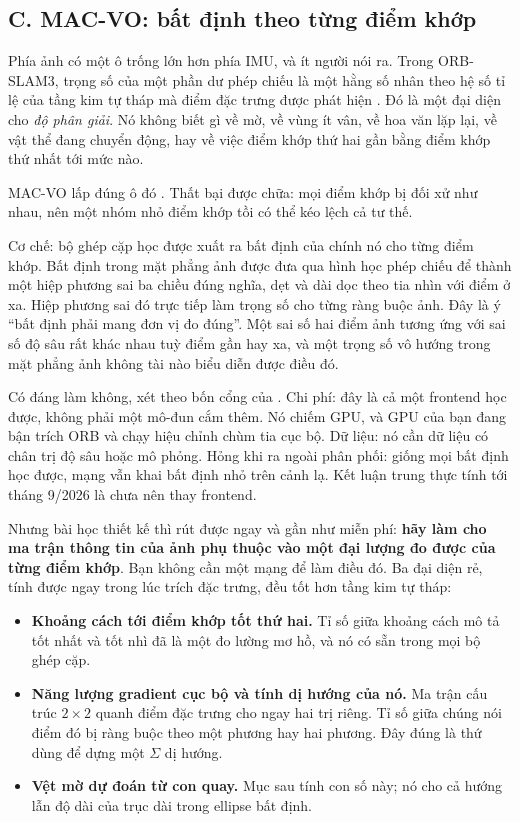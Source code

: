 \documentclass[../../deep_learning.tex]{subfiles}
\begin{document}
\subsection{C. MAC-VO: bất định theo từng điểm khớp}

Phía ảnh có một ô trống lớn hơn phía IMU, và ít người nói ra. Trong ORB-SLAM3, trọng số của một phần dư phép chiếu là một hằng số nhân theo hệ số tỉ lệ của tầng kim tự tháp mà điểm đặc trưng được phát hiện \cite{campos2021orbslam3}. Đó là một đại diện cho \emph{độ phân giải}. Nó không biết gì về mờ, về vùng ít vân, về hoa văn lặp lại, về vật thể đang chuyển động, hay về việc điểm khớp thứ hai gần bằng điểm khớp thứ nhất tới mức nào.

MAC-VO lấp đúng ô đó \cite{qiu2025macvo}. Thất bại được chữa: mọi điểm khớp bị đối xử như nhau, nên một nhóm nhỏ điểm khớp tồi có thể kéo lệch cả tư thế.

Cơ chế: bộ ghép cặp học được xuất ra bất định của chính nó cho từng điểm khớp. Bất định trong mặt phẳng ảnh được đưa qua hình học phép chiếu để thành một hiệp phương sai ba chiều đúng nghĩa, dẹt và dài dọc theo tia nhìn với điểm ở xa. Hiệp phương sai đó trực tiếp làm trọng số cho từng ràng buộc ảnh. Đây là ý ``bất định phải mang đơn vị đo đúng''. Một sai số hai điểm ảnh tương ứng với sai số độ sâu rất khác nhau tuỳ điểm gần hay xa, và một trọng số vô hướng trong mặt phẳng ảnh không tài nào biểu diễn được điều đó.

Có đáng làm không, xét theo bốn cổng của . Chi phí: đây là cả một frontend học được, không phải một mô-đun cắm thêm. Nó chiếm GPU, và GPU của bạn đang bận trích ORB và chạy hiệu chỉnh chùm tia cục bộ. Dữ liệu: nó cần dữ liệu có chân trị độ sâu hoặc mô phỏng. Hỏng khi ra ngoài phân phối: giống mọi bất định học được, mạng vẫn khai bất định nhỏ trên cảnh lạ. Kết luận trung thực tính tới tháng 9/2026 là chưa nên thay frontend.

Nhưng bài học thiết kế thì rút được ngay và gần như miễn phí: \textbf{hãy làm cho ma trận thông tin của ảnh phụ thuộc vào một đại lượng đo được của từng điểm khớp}. Bạn không cần một mạng để làm điều đó. Ba đại diện rẻ, tính được ngay trong lúc trích đặc trưng, đều tốt hơn tầng kim tự tháp:

\begin{itemize}
\item \textbf{Khoảng cách tới điểm khớp tốt thứ hai.} Tỉ số giữa khoảng cách mô tả tốt nhất và tốt nhì đã là một đo lường mơ hồ, và nó có sẵn trong mọi bộ ghép cặp.
\item \textbf{Năng lượng gradient cục bộ và tính dị hướng của nó.} Ma trận cấu trúc \(2\times2\) quanh điểm đặc trưng cho ngay hai trị riêng. Tỉ số giữa chúng nói điểm đó bị ràng buộc theo một phương hay hai phương. Đây đúng là thứ dùng để dựng một \(\Sigma\) dị hướng.
\item \textbf{Vệt mờ dự đoán từ con quay.} Mục sau tính con số này; nó cho cả hướng lẫn độ dài của trục dài trong ellipse bất định.
\end{itemize}
\end{document}
